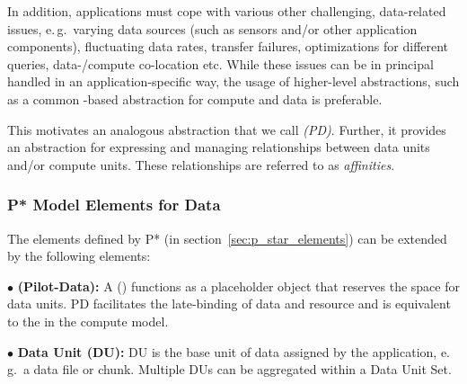 \documentclass[conference]{IEEEtran}
\begin{document}
In addition, applications must cope with various other challenging,
data-related issues, e.\,g.\ varying data sources (such as sensors
and/or other application components), fluctuating data rates, transfer
failures, optimizations for different queries, data-/compute
co-location etc. While these issues can be in principal handled in an
application-specific way, the usage of higher-level abstractions, such
as a common \pilot-based abstraction for compute and data is
preferable.  


This motivates an analogous abstraction that we call \emph{\pilotdata
  (PD)}.  Further, it provides an abstraction for expressing and
managing relationships between data units and/or compute units. These
relationships are referred to as \emph{affinities}.


\subsubsection*{P* Model Elements for Data}


The elements defined by P* (in section~\ref{sec:p_star_elements}) can
be extended by the following elements:


\noindent$\bullet$
  \textbf{\pilot (Pilot-Data):} A \pilotdata (\pd) functions as a 
	placeholder object that reserves the space
	for data units. PD facilitates the late-binding of data and resource and is
	equivalent to the \pilot in the compute model.

\noindent$\bullet$
  \textbf{Data Unit (DU):} DU is the base unit of data assigned by
  the application,  e.\,g.\ a data file or chunk. Multiple DUs can be aggregated 
   within a Data Unit Set.

\end{document}
